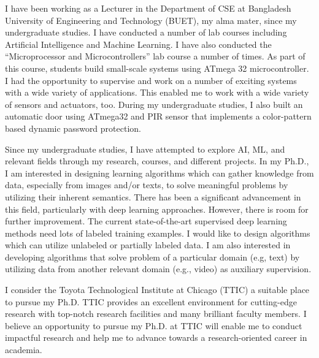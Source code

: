\documentclass[12pt]{article}
\begin{document}
I have been working as a Lecturer in the Department of CSE at Bangladesh University of Engineering and Technology (BUET), my alma mater, since my undergraduate studies. I have conducted a number of lab courses including Artificial Intelligence and Machine Learning. I have also conducted the ``Microprocessor and Microcontrollers'' lab course a number of times. As part of this course, students build small-scale systems using ATmega 32 microcontroller. I had the opportunity to supervise and work on a number of exciting systems with a wide variety of applications. This enabled me to work with a wide variety of sensors and actuators, too. During my undergraduate studies, I also built an automatic door using ATmega32 and PIR sensor that implements a color-pattern based dynamic password protection. 

Since my undergraduate studies, I have attempted to explore AI, ML, and relevant fields through my research, courses, and different projects. In my Ph.D., I am interested in designing learning algorithms which can gather knowledge from data, especially from images and/or texts, to solve meaningful problems by utilizing their inherent semantics. There has been a significant advancement in this field, particularly with deep learning approaches. However, there is room for further improvement. The current state-of-the-art supervised deep learning methods need lots of labeled training examples. I would like to design algorithms which can utilize unlabeled or partially labeled data. I am also interested in developing algorithms that solve problem of a particular domain (e.g, text) by utilizing data from another relevant domain (e.g., video) as auxiliary supervision.

I consider the Toyota Technological Institute at Chicago (TTIC) a suitable place to pursue my Ph.D. TTIC provides an excellent environment for cutting-edge research with top-notch research facilities and many brilliant faculty members. I believe an opportunity to pursue my Ph.D. at TTIC will enable me to conduct impactful research and help me to advance towards a research-oriented career in academia.


\end{document}
